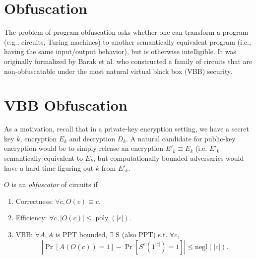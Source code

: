 %
%



\newcommand{\ABS}[1]{\left\vert#1\right\vert}
\newcommand{\SET}[1]{\left\{#1\right\}}  
\newcommand{\INP}[1]{\left(#1\right)}
\newcommand{\POLY}[1]{\ensuremath{\mathop{\mathrm{poly}}\INP{#1}}}
\newcommand{\ENC}[1]{\ensuremath{\mathop{\mathrm{Enc}}\INP{#1}}}
\newcommand{\DEC}[1]{\ensuremath{\mathop{\mathrm{Dec}}\INP{#1}}}
%

\section{Obfuscation}
The problem of program obfuscation asks whether one can transform a program (e.g., circuits, Turing machines) to another semantically equivalent program (i.e., having the same input/output behavior), but is otherwise intelligible.
It was originally formalized by Barak et al. who constructed a family of circuits that are non-obfuscatable under the most natural virtual black box (VBB) security.
\section{VBB Obfuscation}
As a motivation, recall that in a private-key encryption setting, we have a secret key $k$, encryption $E_k$ and decryption $D_k$.
A natural candidate for public-key encryption would be to simply release an encryption $E'_k \equiv E_k$ (i.e. $E'_k$ semantically equivalent to $E_k$, but computationally bounded adversaries would have a hard time figuring out $k$ from $E'_k$.

\begin{definition}
	$O$ is an \emph{obfuscator} of circuits if %
	\begin{enumerate}
		\item
			Correctness:
	$\forall c, O(c) \equiv c$.
	\item
		Efficiency:
		$\forall c, \ABS{O(c)} \le \POLY{\ABS{c}}$.
	\item
		VBB:
		$\forall A, A$ is PPT bounded, $\exists$ S (also PPT) s.t. $\forall c$,
		\[
			\ABS{\Pr\left[ A\left( O(c) \right) = 1\right] - \Pr\left[ S^c(1^{\ABS{c}}) = 1 \right]} \le \mathrm{negl}(\ABS{c}).
		\]
	\end{enumerate}
\end{definition}

